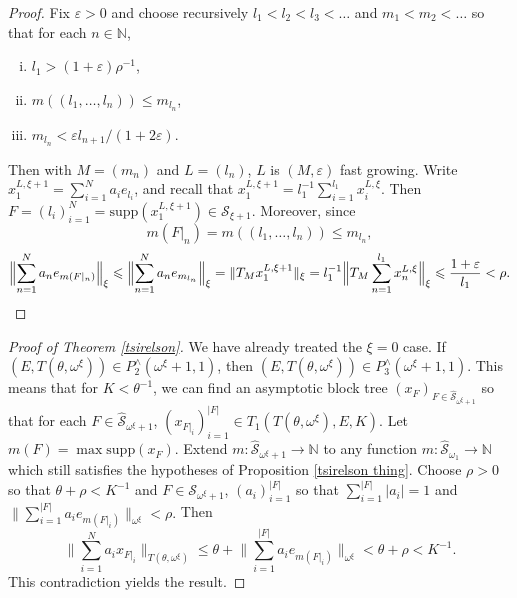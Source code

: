 \documentclass[12pt]{amsart}
\theoremstyle{definition}
\newcommand{\nn}{\mathbb{N}}
\newcommand{\sss}{\mathcal{S}}
\newcommand{\supp}{\mathrm{supp}}
\begin{document}
\begin{proof} Fix $\varepsilon>0$ and choose recursively $l_1<l_2< l_3< \ldots$ and $m_1< m_2< \ldots$ so that for each $n\in \nn$,  \begin{enumerate}[(i)]\item $l_1> (1+\varepsilon)\rho^{-1}$, \item $m((l_1, \ldots, l_n))\leqslant m_{l_n}$, \item $m_{l_n}< \varepsilon l_{n+1}/ (1+2\varepsilon)$. \end{enumerate}

Then with $M=(m_n)$ and $L=(l_n)$, $L$ is $(M, \varepsilon)$ fast growing.  Write $x^{L, \xi+1}_1=\sum_{i=1}^N a_i e_{l_i}$, and recall that $x^{L, \xi+1}_1=l_1^{-1}\sum_{i=1}^{l_1} x_i^{L, \xi}$.  Then $F=(l_i)_{i=1}^N=\supp(x^{L, \xi+1}_1)\in \sss_{\xi+1}$.  Moreover, since $$m(F|_n)= m((l_1, \ldots, l_n))\leqslant m_{l_n},$$  $$\Bigl\|\sum_{n=1}^N a_n e_{m(F|_n)}\Bigr\|_\xi \leqslant \Bigl\|\sum_{n=1}^N a_n e_{m_{l_n}}\Bigr\|_\xi= \|T_M x_1^{L, \xi+1}\|_\xi = l_1^{-1}\Bigl\|T_M\sum_{n=1}^{l_1} x_n^{L, \xi}\Bigr\|_\xi \leqslant \frac{1+\varepsilon}{l_1}<\rho.$$




\end{proof}



\begin{proof}[Proof of Theorem \ref{tsirelson}] We have already treated the $\xi=0$ case.  If $(E,T(\theta, \omega^\xi))\in P_2^\wedge(\omega^\xi+1, 1)$, then $(E,T(\theta, \omega^\xi))\in P^\wedge_3(\omega^\xi+1, 1)$.  This means that for $K< \theta^{-1}$, we can find an asymptotic block tree $(x_F)_{F\in \widehat{\sss}_{\omega^\xi+1}}$ so that for each $F\in \widehat{\sss}_{\omega^\xi+1}$, $(x_{F|_i})_{i=1}^{|F|}\in T_1(T(\theta, \omega^\xi), E, K)$.   Let $m(F)=\max \supp(x_F)$.  Extend $m:\widehat{\sss}_{\omega^\xi+1}\to \nn$ to any function $m:\widehat{\sss}_{\omega_1}\to \nn$ which still satisfies the hypotheses of Proposition \ref{tsirelson thing}.  Choose $\rho>0$ so that $\theta+ \rho < K^{-1}$ and $F\in \sss_{\omega^\xi+1}$, $(a_i)_{i=1}^{|F|}$ so that $\sum_{i=1}^{|F|}|a_i|=1$ and $\|\sum_{i=1}^{|F|} a_i e_{m(F|_i)}\|_{\omega^\xi}< \rho.$  Then $$\bigl\|\sum_{i=1}^N a_ix_{F|_i}\bigr\|_{T(\theta, \omega^\xi)} \leqslant \theta + \bigl\|\sum_{i=1}^{|F|} a_i e_{m(F|_i)}\bigr\|_{\omega^\xi} < \theta+\rho < K^{-1}.$$  This contradiction yields the result.  


\end{proof}
\end{document}

